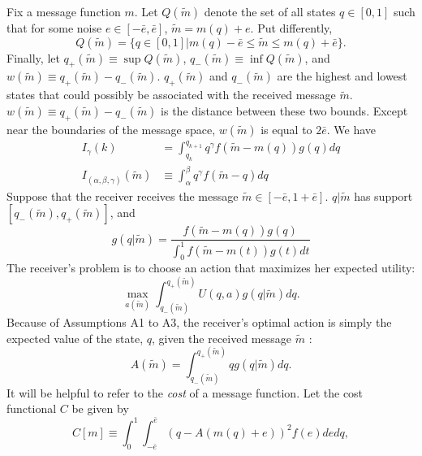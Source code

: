 \documentclass{article}
\begin{document}
Fix a message function $m$. Let $Q(\widetilde{m})$ denote the set of all states $q\in [ 0,1]$ such that for some noise $e\in [ -\bar{e},\bar{e}]$, $\widetilde{m}=m(q)+e$. Put differently, 
\begin{equation}
	Q(\widetilde{m})=\{q\in[0,1]|m(q)-\bar{e}\leq \widetilde{m}\leq m(q)+\bar{e}\}.
\end{equation}
Finally, let $q_{+}(\widetilde{m})\equiv \sup Q(\widetilde{m})$, $q_{-}(\widetilde{m})\equiv \inf Q(\widetilde{m})$, and $w(\widetilde{m})\equiv q_{+}(\widetilde{m})-q_{-}(\widetilde{m})$. $q_{+}(\widetilde{m})$ and $ q_{-}(\widetilde{m})$ are the highest and lowest states that could possibly be associated with the received message $\widetilde{m}$. $w(\widetilde{m})\equiv q_{+}(\widetilde{m})-q_{-}( \widetilde{m})$ is the distance between these two bounds. Except near the boundaries of the message space, $w(\widetilde{m})$ is equal to $2\bar{e}$.
We have
\begin{align}
	I_{\gamma}(k)&=\int_{q_{k}}^{q_{k+1}}{q^\gamma f(\widetilde{m}-m(q))g(q)dq}\\
	I_{(\alpha,\beta,\gamma)}(\widetilde{m})&\equiv\int_{\alpha}^{\beta}{q^{\gamma}f(\tilde{m}-q)dq}
\end{align}
Suppose that the receiver receives the message $\widetilde{m}\in [ - \bar{e},1+\bar{e}]$. $q|\widetilde{m}$ has support $[q_{-}( \widetilde{m}),q_{+}(\widetilde{m})]$, and 
\begin{equation} 
	g(q|\widetilde{m})=\frac{f(\widetilde{m}-m(q))g(q)}{\int_{0}^{1}{ f(\widetilde{m}-m(t))g(t)dt}}  \label{eq:posterior} 
\end{equation} 
The receiver's problem is to choose an action that maximizes her expected utility: 
\begin{equation} 
	\max_{a(\widetilde{m})}\int_{q_{-}(\widetilde{m})}^{q_{+}(\widetilde{m})}{U(q,a)g(q|\widetilde{m})}dq.  
\end{equation} 
Because of Assumptions A1 to A3, the receiver's optimal action is simply the expected value of the state, $q$, given the received message $\widetilde{m}$ : 
\begin{equation} 
	A(\widetilde{m})=\int_{q_{-}(\widetilde{m})}^{q_{+}(\widetilde{m})}{qg(q| \widetilde{m})}dq.  \label{eq:optact} 
\end{equation}
It will be helpful to refer to the \textit{cost }of a message function. Let the cost functional $C$ be given by 
\begin{equation}
	C[m]\equiv \int_{0}^{1}{\int_{-\bar{e}}^{\bar{e}}{(q-A(m(q)+e))^{2}f(e)de}dq},  
\end{equation}
\end{document}
